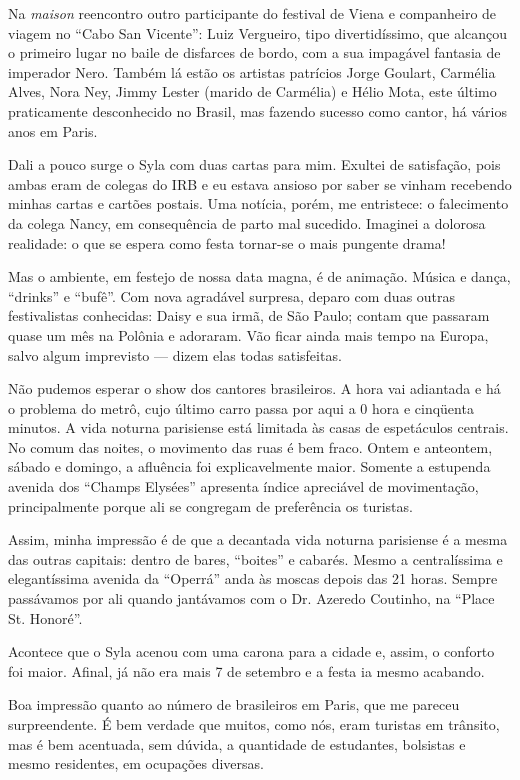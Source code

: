 Na \textit{maison} reencontro outro participante do festival de Viena e companheiro de viagem no ``Cabo San Vicente'': Luiz Vergueiro, tipo divertidíssimo, que alcançou o primeiro lugar no baile de disfarces de bordo, com a sua impagável fantasia de imperador Nero. Também lá estão os artistas patrícios Jorge Goulart, Carmélia Alves, Nora Ney, Jimmy Lester (marido de Carmélia) e Hélio Mota, este último praticamente desconhecido no Brasil, mas fazendo sucesso como cantor, há vários anos em Paris.

Dali a pouco surge o Syla com duas cartas para mim. Exultei de satisfação, pois ambas eram de colegas do IRB e eu estava ansioso por saber se vinham recebendo minhas cartas e cartões postais. Uma notícia, porém, me entristece: o falecimento da colega Nancy, em consequência de parto mal sucedido. Imaginei a dolorosa realidade: o que se espera como festa tornar-se o mais pungente drama!

Mas o ambiente, em festejo de nossa data magna, é de animação. Música e dança, ``drinks'' e ``bufê''. Com nova agradável surpresa, deparo com duas outras festivalistas conhecidas: Daisy e sua irmã, de São Paulo; contam que passaram quase um mês na Polônia e adoraram. Vão ficar ainda mais tempo na Europa, salvo algum imprevisto --- dizem elas todas satisfeitas.

Não pudemos esperar o show dos cantores brasileiros. A hora vai adiantada e há o problema do metrô, cujo último carro passa por aqui a 0 hora e cinqüenta minutos. A vida noturna parisiense está limitada às casas de espetáculos centrais. No comum das noites, o movimento das ruas é bem fraco. Ontem e anteontem, sábado e domingo, a afluência foi explicavelmente maior. Somente a estupenda avenida dos ``Champs Elysées'' apresenta índice apreciável de movimentação, principalmente porque ali se congregam de preferência os turistas.

Assim, minha impressão é de que a decantada vida noturna parisiense é a mesma das outras capitais: dentro de bares, ``boites'' e cabarés. Mesmo a centralíssima e elegantíssima avenida da ``Operrá'' anda às moscas depois das 21 horas. Sempre passávamos por ali quando jantávamos com o Dr. Azeredo Coutinho, na ``Place St. Honoré''.

Acontece que o Syla acenou com uma carona para a cidade e, assim, o conforto foi maior. Afinal, já não era mais 7 de setembro e a festa ia mesmo acabando.

Boa impressão quanto ao número de brasileiros em Paris, que me pareceu surpreendente. É bem verdade que muitos, como nós, eram turistas em trânsito, mas é bem acentuada, sem dúvida, a quantidade de estudantes, bolsistas e mesmo residentes, em ocupações diversas.


